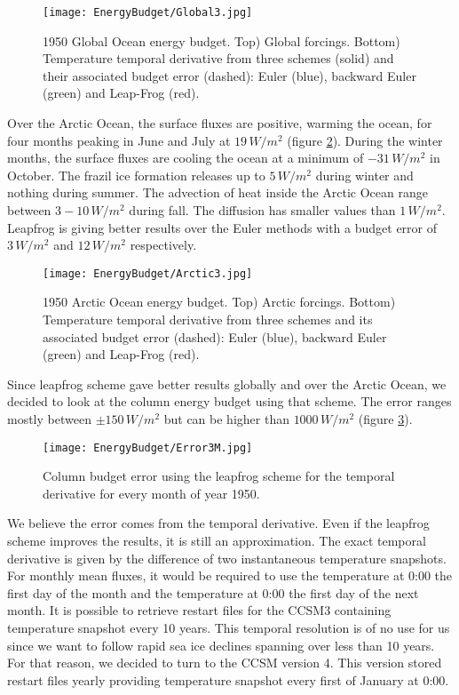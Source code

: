 \begin{figure}
\center
\texttt{[image: EnergyBudget/Global3.jpg]}
\caption{1950 Global Ocean energy budget. Top) Global forcings. Bottom) Temperature temporal derivative from three schemes (solid) and their associated budget error (dashed): Euler (blue), backward Euler (green) and Leap-Frog (red).}
\label{G3}
\end{figure}

Over the Arctic Ocean, the surface fluxes are positive, warming the ocean, for four months peaking in June and July at $19 \, W/m^2$ (figure \ref{A3}). During the winter months, the surface fluxes are cooling the ocean at a minimum of $-31 \, W/m^2$ in October. The frazil ice formation releases up to $5 \, W/m^2$ during winter and nothing during summer. The advection of heat inside the Arctic Ocean range between $3-10 \, W/m^2$ during fall. The diffusion has smaller values than $1 \, W/m^2$. Leapfrog is giving better results over the Euler methods with a budget error of $3 \, W/m^2$ and $12 \, W/m^2$ respectively.

\begin{figure}
\center
\texttt{[image: EnergyBudget/Arctic3.jpg]}
\caption{1950 Arctic Ocean energy budget. Top) Arctic forcings. Bottom) Temperature temporal derivative from three schemes and its associated budget error (dashed): Euler (blue), backward Euler (green) and Leap-Frog (red).}
\label{A3}
\end{figure}

Since leapfrog scheme gave better results globally and over the Arctic Ocean, we decided to look at the column energy budget using that scheme. The error ranges mostly between $\pm 150 \, W/m^2$ but can be higher than $1000 \, W/m^2$ (figure \ref{C3}).

\begin{figure}
\center
\texttt{[image: EnergyBudget/Error3M.jpg]}
\caption{Column budget error using the leapfrog scheme for the temporal derivative for every month of year 1950.}
\label{C3}
\end{figure}

We believe the error comes from the temporal derivative. Even if the leapfrog scheme improves the results, it is still an approximation. The exact temporal derivative is given by the difference of two instantaneous temperature snapshots. For monthly mean fluxes, it would be required to use the temperature at 0:00 the first day of the month and the temperature at 0:00 the first day of the next month. It is possible to retrieve restart files for the CCSM3 containing temperature snapshot every 10 years. This temporal resolution is of no use for us since we want to follow rapid sea ice declines spanning over less than 10 years. For that reason, we decided to turn to the CCSM version 4. This version stored restart files yearly providing temperature snapshot every first of January at 0:00.  



